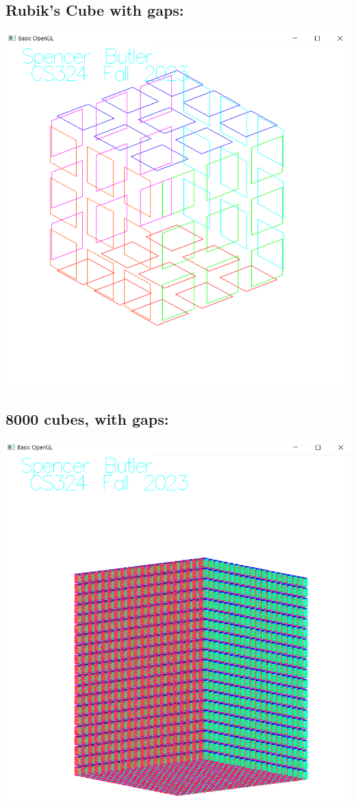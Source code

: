 \documentclass[12pt]{article}
\begin{document}
\subsection{Rubik's Cube with gaps:}
\noindent \includegraphics{screens/gaps}
\subsection{8000 cubes, with gaps:}
\noindent \includegraphics{screens/cubes}
\end{document}
